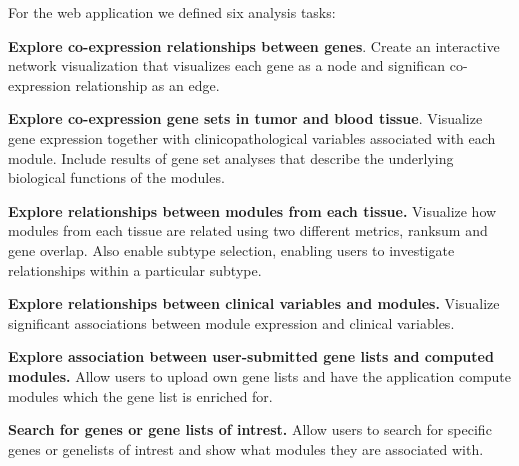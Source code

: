 For the web application we defined six analysis tasks: 

\textbf{Explore co-expression relationships between genes}. Create an
interactive network visualization that visualizes each gene as a node and
significan co-expression relationship as an edge. 

\textbf{Explore co-expression gene sets in tumor and blood tissue}.
Visualize gene expression together with clinicopathological variables associated
with each module. Include results of gene set analyses that describe the
underlying biological functions of the modules. 

\textbf{Explore relationships between modules from each tissue.}
Visualize how modules from each tissue are related using two different
metrics, ranksum and gene overlap. Also enable subtype selection,
enabling users to investigate relationships within a particular subtype. 

\textbf{Explore relationships between clinical variables and modules.}
Visualize significant associations between module expression and
clinical variables.

\textbf{Explore association between user-submitted gene lists and computed
modules.} Allow users to upload own gene lists and have the application compute
modules which the gene list is enriched for. 

\textbf{Search for genes or gene lists of intrest.} Allow users to search
for specific genes or genelists of intrest and show what modules they are
associated with. 



